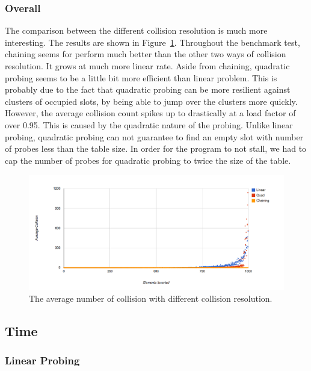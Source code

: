 \documentclass[11pt]{article}
\begin{document}
\subsubsection{Overall}
The comparison between the different collision resolution is much more interesting.
The results are shown in Figure~\ref{fig:collision}.
Throughout the benchmark test, chaining seems for perform much better than the other
two ways of collision resolution. It grows at much more linear rate. 
Aside from chaining, quadratic probing seems to be a little bit more 
efficient than linear problem. This is probably due to the fact that quadratic probing 
can be more resilient against clusters of occupied slots, by being able to jump over
the clusters more quickly. However, the average collision count spikes up to drastically
at a load factor of over 0.95. This is caused by the quadratic nature of the probing. Unlike linear
probing, quadratic probing can not guarantee to find an empty slot with number of probes
less than the table size. In order for the program to not stall, we had to cap the number of probes for quadratic probing to twice the size of the table.

\begin{figure}
        
                \centering
                \includegraphics[width=\textwidth]{collision-all.png}
              \caption{The average number of collision with different collision resolution.}
              \label{fig:collision}
\end{figure}


\subsection{Time}

\subsubsection{Linear Probing}
\end{document}
